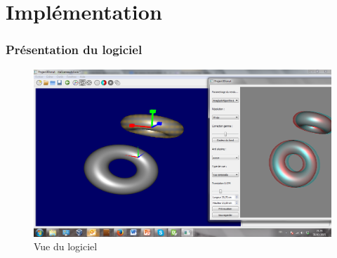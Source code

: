 \documentclass{beamer}
\begin{document}
%


\section{Implémentation}

\begin{frame}
\frametitle{Présentation du logiciel}
\begin{figure}
\includegraphics[scale=0.22]{logiciel.png}
\caption{Vue du logiciel}
\end{figure}
\end{frame}
\end{document}
